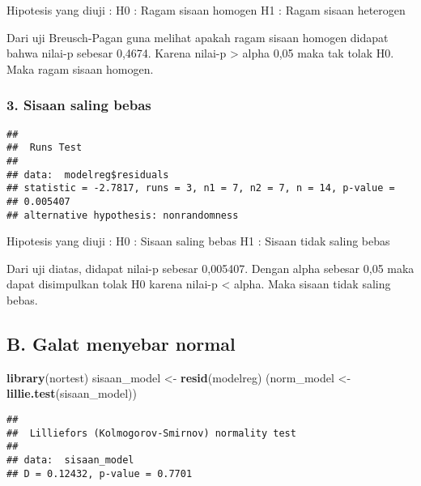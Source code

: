 \documentclass[
]{article}
\newenvironment{Shaded}{\begin{snugshade}}{\end{snugshade}}
\newcommand{\FunctionTok}[1]{\textcolor[rgb]{0.13,0.29,0.53}{\textbf{#1}}}
\newcommand{\NormalTok}[1]{#1}
\newcommand{\OtherTok}[1]{\textcolor[rgb]{0.56,0.35,0.01}{#1}}
\newcommand{\SpecialCharTok}[1]{\textcolor[rgb]{0.81,0.36,0.00}{\textbf{#1}}}
\begin{document}
Hipotesis yang diuji : H0 : Ragam sisaan homogen H1 : Ragam sisaan
heterogen

Dari uji Breusch-Pagan guna melihat apakah ragam sisaan homogen didapat
bahwa nilai-p sebesar 0,4674. Karena nilai-p \textgreater{} alpha 0,05
maka tak tolak H0. Maka ragam sisaan homogen.

\hypertarget{sisaan-saling-bebas}{%
\subsubsection{3. Sisaan saling bebas}\label{sisaan-saling-bebas}}

\begin{Shaded}
\end{Shaded}

\begin{verbatim}
## 
##  Runs Test
## 
## data:  modelreg$residuals
## statistic = -2.7817, runs = 3, n1 = 7, n2 = 7, n = 14, p-value =
## 0.005407
## alternative hypothesis: nonrandomness
\end{verbatim}

Hipotesis yang diuji : H0 : Sisaan saling bebas H1 : Sisaan tidak saling
bebas

Dari uji diatas, didapat nilai-p sebesar 0,005407. Dengan alpha sebesar
0,05 maka dapat disimpulkan tolak H0 karena nilai-p \textless{} alpha.
Maka sisaan tidak saling bebas.

\hypertarget{b.-galat-menyebar-normal}{%
\subsection{B. Galat menyebar normal}\label{b.-galat-menyebar-normal}}

\begin{Shaded}
\begin{Highlighting}[]
\FunctionTok{library}\NormalTok{(nortest)}
\NormalTok{sisaan\_model }\OtherTok{\textless{}{-}} \FunctionTok{resid}\NormalTok{(modelreg)}
\NormalTok{(norm\_model }\OtherTok{\textless{}{-}} \FunctionTok{lillie.test}\NormalTok{(sisaan\_model))}
\end{Highlighting}
\end{Shaded}

\begin{verbatim}
## 
##  Lilliefors (Kolmogorov-Smirnov) normality test
## 
## data:  sisaan_model
## D = 0.12432, p-value = 0.7701
\end{verbatim}
\end{document}
